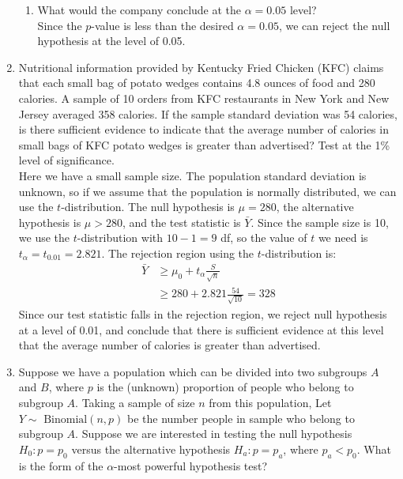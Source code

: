 \documentclass[12pt]{article}
\begin{document}
\begin{enumerate}
\begin{enumerate}
\item What would the company conclude at the $\alpha = 0.05$ level?\\

Since the $p$-value is less than the desired $\alpha = 0.05$, we can reject the null hypothesis at the level of 0.05.
\end{enumerate}

\item Nutritional information provided by Kentucky Fried Chicken (KFC) claims that each small bag of potato wedges contains 4.8 ounces of food and 280 calories. A sample of 10 orders from KFC restaurants in New York and New Jersey averaged 358 calories.
If the sample standard deviation was 54 calories, is there sufficient evidence to indicate that the average number of calories in small bags of KFC potato wedges is greater than advertised? Test at the 1\% level of significance.\\

Here we have a small sample size. The population standard deviation is unknown, so if we assume that the population is normally distributed, we can use the $t$-distribution. The null hypothesis is $\mu = 280$, the alternative hypothesis is $\mu > 280$, and the test statistic is $\bar{Y}$. Since the sample size is 10, we use the $t$-distribution with $10 - 1 = 9$ df, so the value of $t$ we need is $t_\alpha = t_{0.01} = 2.821$. The rejection region using the $t$-distribution is:
\begin{align*}
\bar{Y} &\geq \mu_0 + t_\alpha \frac{S}{\sqrt{n}} \\
&\geq 280 + 2.821 \frac{54}{\sqrt{10}} = 328
\end{align*}
Since our test statistic falls in the rejection region, we reject null hypothesis at a level of 0.01, and conclude that there is sufficient evidence at this level that the average number of calories is greater than advertised.

\item Suppose we have a population which can be divided into two subgroups $A$ and $B$, where $p$ is the (unknown) proportion of people who belong to subgroup $A$. Taking a sample of size $n$ from this population, Let $Y \sim \text{ Binomial}(n, p)$ be the number people in sample who belong to subgroup $A$. Suppose we are interested in testing the null hypothesis $H_0: p = p_0$ versus the alternative hypothesis $H_a: p = p_a$, where $p_a < p_0$. What is the form of the $\alpha$-most powerful hypothesis test?\\


\end{enumerate}
\end{document}
